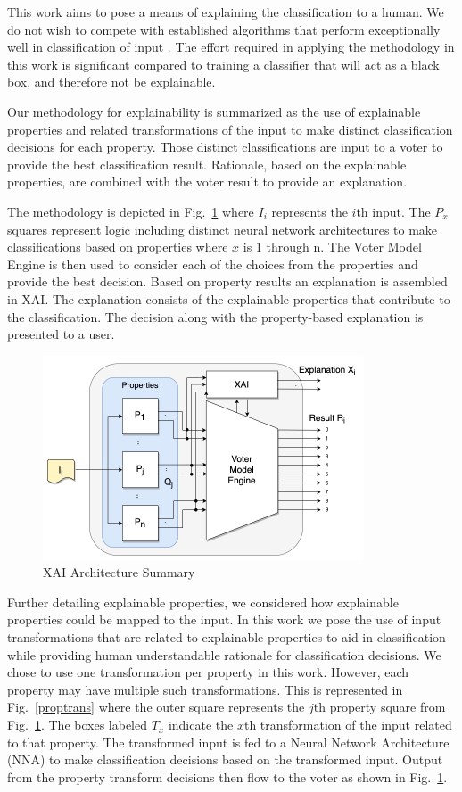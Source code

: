 \documentclass[conference]{IEEEtran}
\begin{document}
This work aims to pose a means of explaining the classification to a human.  We do not wish to compete with established algorithms that perform exceptionally well in classification of input \cite{lecun98} \cite{keysers07} \cite{schm2012}.  The effort required in applying the methodology in this work is significant compared to training a classifier that will act as a black box, and therefore not be explainable.

Our methodology for explainability is summarized as the use of explainable properties and related transformations of the input to make distinct classification decisions for each property.  Those distinct classifications are input to a voter to provide the best classification result.  Rationale, based on the explainable properties, are combined with the voter result to provide an explanation. 

The methodology is depicted in Fig.~\ref{voting} where $I_i$ represents the $i$th input.  The $P_x$ squares represent logic including distinct neural network architectures to make classifications based on properties where $x$ is 1 through n.  The Voter Model Engine is then used to consider each of the choices from the properties and provide the best decision.  Based on property results an explanation is assembled in XAI.   The explanation consists of the explainable properties that contribute to the classification.   The decision along with the property-based explanation is presented to a user.

 \begin{figure}[htbp]
\centerline{\includegraphics[width=95mm]{./images/voting_prop_nn_2.png}}
\caption{XAI Architecture Summary}
\label{voting}
\end{figure}

Further detailing explainable properties, we considered how explainable properties could be mapped to the input.  In this work we pose the use of input transformations that are related to explainable properties to aid in classification while providing human understandable rationale for classification decisions.  We chose to use one transformation per property in this work.  However, each property may have multiple such transformations.  This is represented in Fig.~\ref{proptrans} where the outer square represents the $j$th property square from Fig.~\ref{voting}.  The boxes labeled $T_x$ indicate the $x$th transformation of the input related to that property.  The transformed input is fed to a Neural Network Architecture (NNA) to make classification decisions based on the transformed input.  Output from the property transform decisions then flow to the voter as shown in Fig.~\ref{voting}.
\end{document}
